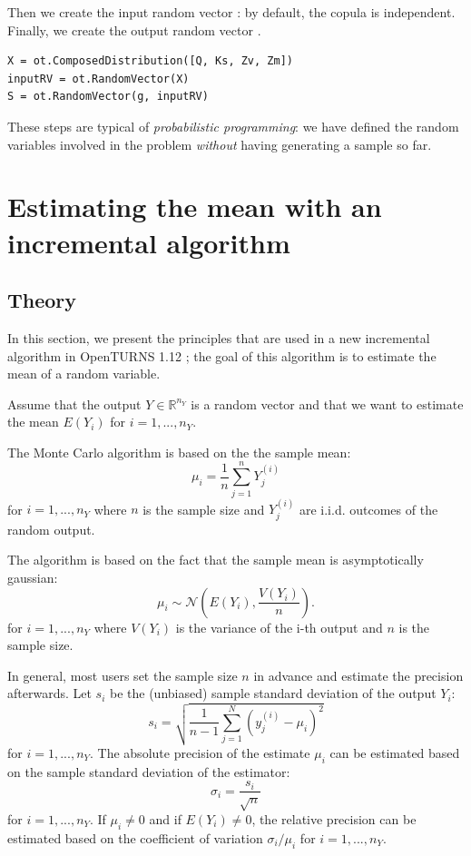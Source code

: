\documentclass{article}
\begin{document}
Then we create the input random vector : by default, the copula is independent. 
Finally, we create the output random vector .
\begin{lstlisting}
X = ot.ComposedDistribution([Q, Ks, Zv, Zm])
inputRV = ot.RandomVector(X)
S = ot.RandomVector(g, inputRV)
\end{lstlisting}

These steps are typical of \emph{probabilistic programming}: we 
have defined the random variables involved in the problem 
\emph{without} having generating a sample so far.


\section{Estimating the mean with an incremental algorithm}


\subsection{Theory}

In this section, we present the principles that are used in a new incremental 
algorithm in OpenTURNS 1.12 ; the goal of this algorithm is to estimate the mean of a random variable. 

Assume that the output $Y\in\mathbb{R}^{n_Y}$ is a random vector and that we want to estimate the 
mean $E(Y_i)$ for $i=1,...,n_Y$. 

The Monte Carlo algorithm is based on the the sample mean: 
$$
\mu_i = \frac{1}{n} \sum_{j=1}^n Y_j^{(i)}
$$
for $i=1,...,n_Y$ where $n$ is the sample size and $Y_j^{(i)}$ are i.i.d. outcomes of the random output. 

The algorithm is based on the fact that the sample mean is asymptotically gaussian:
$$
\mu_i \sim \mathcal{N}\left(E(Y_i),\frac{V(Y_i)}{n}\right).
$$
for $i=1,...,n_Y$ where $V(Y_i)$ is the variance of the i-th output and $n$ is the sample size.

In general, most users set the sample size $n$ in advance and estimate the precision afterwards. 
Let $s_i$ be the (unbiased) sample standard deviation of the output $Y_i$:
$$
s_i = \sqrt{\frac{1}{n-1} \sum_{j=1}^N (y_j^{(i)}-\mu_i)^2}
$$
for $i=1,...,n_Y$. 
The absolute precision of the estimate $\mu_i$ can be estimated based on the sample standard deviation of the estimator:
$$
\sigma_i = \frac{s_i}{\sqrt{n}}
$$
for $i=1,...,n_Y$. 
If $\mu_i\neq 0$ and if $E(Y_i)\neq 0$, the relative precision can 
be estimated based on the coefficient of variation $\sigma_i/\mu_i$ 
for $i=1,...,n_Y$. 
 
\end{document}
